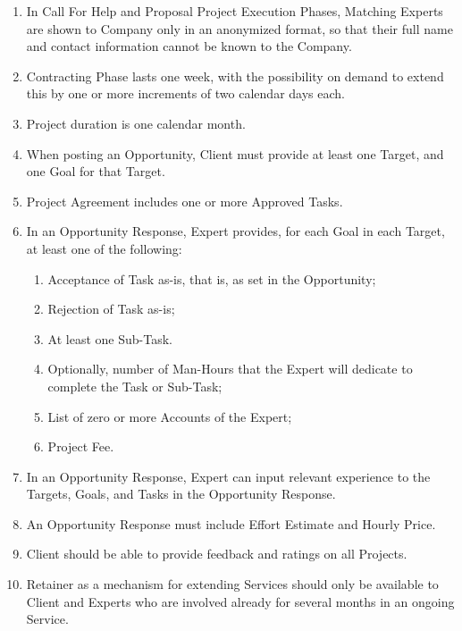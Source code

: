 \documentclass[graybox,envcountchap,sectrefs]{svmono}
\newcommand{\nterm}[1]{\textsf{#1}}
\begin{document}
\begin{enumerate}
\item In \nterm{Call For Help} and \nterm{Proposal} \nterm{Project Execution Phases}, \nterm{Matching Experts} are shown to \nterm{Company} only in an anonymized format, so that their full name and contact information cannot be known to the \nterm{Company}.
\item \nterm{Contracting Phase} lasts one week, with the possibility on demand to extend this by one or more increments of two calendar days each.
\item \nterm{Project} duration is one calendar month.
\item When posting an \nterm{Opportunity}, \nterm{Client} must provide at least one \nterm{Target}, and one Goal for that \nterm{Target}.
\item \nterm{Project Agreement} includes one or more \nterm{Approved Tasks}.
\item In an \nterm{Opportunity Response}, \nterm{Expert} provides, for each \nterm{Goal} in each \nterm{Target}, at least one of the following:
	\begin{enumerate} 
		\item Acceptance of \nterm{Task} as-is, that is, as set in the \nterm{Opportunity};
		\item Rejection of \nterm{Task} as-is;
		\item At least one \nterm{Sub-Task}.
		\item Optionally, number of \nterm{Man-Hours} that the \nterm{Expert} will dedicate to complete the \nterm{Task} or \nterm{Sub-Task};
		\item List of zero or more \nterm{Accounts} of the \nterm{Expert}; 
		\item \nterm{Project Fee}.
	\end{enumerate}
\item In an \nterm{Opportunity Response}, \nterm{Expert} can input relevant experience to the \nterm{Targets}, \nterm{Goals}, and \nterm{Tasks} in the \nterm{Opportunity Response}.
\item An \nterm{Opportunity Response} must include \nterm{Effort Estimate} and \nterm{Hourly Price}.
\item \nterm{Client} should be able to provide feedback and ratings on all \nterm{Projects}.
\item Retainer as a mechanism for extending \nterm{Services} should only be available to \nterm{Client} and \nterm{Experts} who are involved already for several months in an ongoing \nterm{Service}.
\end{enumerate}
\end{document}
